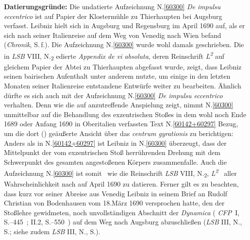 \begin{ledgroup}%
\footnotesize%
\pstart%
\noindent%
\textbf{Datierungsgründe:}%
Die undatierte Aufzeichnung N.\;\ref{60300} \textit{De impulsu eccentrico} ist auf Papier der Klostermühle zu Thierhaupten bei Augsburg verfasst.
Leibniz hielt sich in Augsburg und Regensburg im April 1690 auf, als er sich nach seiner Italienreise auf dem Weg von Venedig nach Wien befand (\textit{Chronik}, S.\,f.).\cite{01236}
Die Aufzeichnung N.\;\ref{60300} wurde wohl damals geschrieben.
Die in \textit{LSB} VIII, N.\textsubscript{2} edierte \textit{Appendix de vi absoluta},\cite{01397} deren Reinschrift \textit{L\textsuperscript{2}} auf gleichem Papier der Abtei zu Thierhaupten abgefasst wurde, zeigt, dass Leibniz seinen bairischen Aufenthalt unter anderem nutzte, um einige in den letzten Monaten seiner Italienreise entstandene Entwürfe weiter zu bearbeiten.
Ähnlich dürfte es sich auch mit der Aufzeichnung N.\;\ref{60300} \textit{De impulsu eccentrico} verhalten.
Denn wie die auf  anzutreffende Anspielung zeigt, nimmt N.\;\ref{60300} unmittelbar auf die Behandlung des exzentrischen Stoßes in dem wohl noch Ende 1689 oder Anfang 1690 in Oberitalien verfassten Text N.\;\ref{60142+60297} Bezug, um die dort () geäußerte Ansicht über das \textit{centrum gyrationis} zu berichtigen:
Anders als in N.\;\ref{60142+60297} ist Leibniz in N.\;\ref{60300} überzeugt, dass der Mittelpunkt der vom exzentrischen Stoß herrührenden Drehung mit dem Schwerpunkt des gesamten angestoßenen Körpers zusammenfalle.
Auch die Aufzeichnung N.\;\ref{60300} ist somit \textendash\ wie die Reinschrift \textit{LSB} VIII, N.\textsubscript{2}, \textit{L\textsuperscript{2}} \textendash\ aller Wahrscheinlichkeit nach auf April 1690 zu datieren.
\pend%
\pstart%
Ferner gilt es zu beachten, dass kurz vor seiner Abreise aus Venedig Leibniz in seinem Brief an Rudolf Christian von Bodenhausen vom 18.\;März 1690 versprochen hatte, den der Stoßlehre gewidmeten, noch unvollständigen Abschnitt der \textit{Dynamica} (%
\textit{CFP}~I, S.--445~; II.2, S.--550~)\cite{01354} auf dem Weg nach Augsburg abzuschließen (\textit{LSB} III, N., S.;\cite{01392} siehe zudem \textit{LSB} III, N., S.).\cite{01390}

\end{ledgroup}
